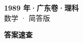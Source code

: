 \documentclass[zihao=-4, a4paper]{ctexart}
\begin{document}
\begin{center}
  {\Large\bfseries 1989 年·广东卷·理科}\\[4pt]
  {\large 数学 · 简答版}
\end{center}
\medskip
{}

\clearpage
{}
\begin{center}{\Large\bfseries 答案速查}\end{center}
\medskip

\end{document}
